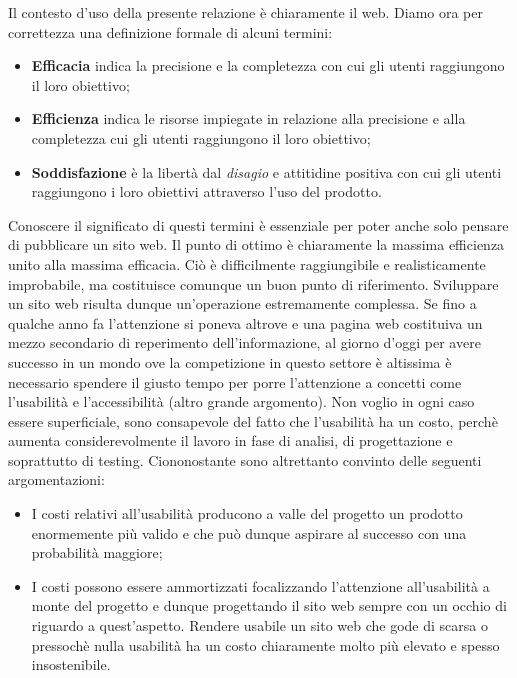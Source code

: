 Il contesto d'uso della presente relazione è chiaramente il web. Diamo ora per correttezza una definizione formale di alcuni termini:

\begin{itemize}
\item \textbf{Efficacia} indica la precisione e la completezza con cui gli utenti raggiungono il loro obiettivo;
\item \textbf{Efficienza} indica le risorse impiegate in relazione alla precisione e alla completezza cui gli utenti raggiungono il loro obiettivo;
\item \textbf{Soddisfazione} è la libertà dal \textit{disagio} e attitidine positiva con cui gli utenti raggiungono i loro obiettivi attraverso l'uso del prodotto.

\end{itemize}

Conoscere il significato di questi termini è essenziale per poter anche solo pensare di pubblicare un sito web. Il punto di ottimo è chiaramente la massima efficienza unito alla massima efficacia. Ciò è difficilmente raggiungibile e realisticamente improbabile, ma costituisce comunque un buon punto di riferimento.
\linebreak
\linebreak
Sviluppare un sito web risulta dunque un'operazione estremamente complessa. Se fino a qualche anno fa l'attenzione si poneva altrove e una pagina web costituiva un mezzo secondario di reperimento dell'informazione, al giorno d'oggi per avere successo in un mondo ove la competizione in questo settore è altissima è necessario spendere il giusto tempo per porre l'attenzione a concetti come l'usabilità e l'accessibilità (altro grande argomento). Non voglio in ogni caso essere superficiale, sono consapevole del fatto che l'usabilità ha un costo, perchè aumenta considerevolmente il lavoro in fase di analisi, di progettazione e soprattutto di testing. Ciononostante sono altrettanto convinto delle seguenti argomentazioni:

\begin{itemize}

\item I costi relativi all'usabilità producono a valle del progetto un prodotto enormemente più valido e che può dunque aspirare al successo con una probabilità maggiore;
\item I costi possono essere ammortizzati focalizzando l'attenzione all'usabilità a monte del progetto e dunque progettando il sito web sempre con un occhio di riguardo a quest'aspetto. Rendere usabile un sito web che gode di scarsa o pressochè nulla usabilità ha un costo chiaramente molto più elevato e spesso insostenibile.

\end{itemize}


